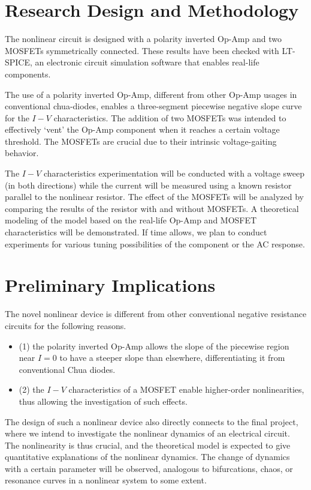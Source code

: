 \documentclass[12pt]{article}
\begin{document}
\section{Research Design and Methodology}


The nonlinear circuit is designed with a polarity inverted Op-Amp and two MOSFETs symmetrically connected. These results have been checked with LT-SPICE, an electronic circuit simulation software that enables real-life components.

The use of a polarity inverted Op-Amp, different from other Op-Amp usages in conventional chua-diodes, enables a three-segment piecewise negative slope curve for the \(I-V\) characteristics.  The addition of two MOSFETs was intended to effectively `vent' the Op-Amp component when it reaches a certain voltage threshold. The MOSFETs are crucial due to their intrinsic voltage-gaiting behavior.

The \(I-V\) characteristics experimentation will be conducted with a voltage sweep (in both directions) while the current will be measured using a known resistor parallel to the nonlinear resistor. The effect of the MOSFETs will be analyzed by comparing the results of the resistor with and without MOSFETs. A theoretical modeling of the model based on the real-life Op-Amp and MOSFET characteristics will be demonstrated. If time allows, we plan to conduct experiments for various tuning possibilities of the component or the AC response. 

\section{Preliminary Implications}


The novel nonlinear device is different from other conventional negative resistance circuits for the following reasons.

\begin{itemize}
    \item (1) the polarity inverted Op-Amp allows the slope of the piecewise region near $I=0$ to have a steeper slope than elsewhere, differentiating it from conventional Chua diodes.
    \item (2) the \(I-V\) characteristics of a MOSFET enable higher-order nonlinearities, thus allowing the investigation of such effects.
\end{itemize}

\noindent The design of such a nonlinear device also directly connects to the final project, where we intend to investigate the nonlinear dynamics of an electrical circuit. The nonlinearity is thus crucial, and the theoretical model is expected to give quantitative explanations of the nonlinear dynamics. The change of dynamics with a certain parameter will be observed, analogous to bifurcations, chaos, or resonance curves in a nonlinear system to some extent.
\end{document}
